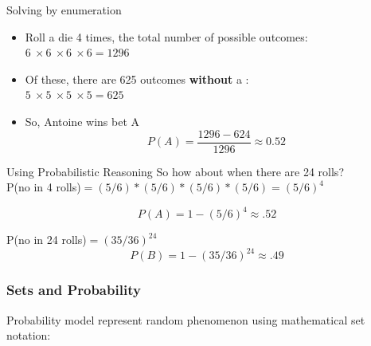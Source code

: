\documentclass{beamer}
\def\die#1{{\domino#1}}
\numberwithin{equation}{section}
\begin{document}
\begin{frame}{Solving by enumeration}
\begin{itemize}
\item[] Roll a die 4 times, the total number of possible outcomes:\\ $6\ \times 6\ \times 6\ \times 6 = 1296$\pause
\item[] Of these, there are 625 outcomes \textbf{without} a \die1:\\  $5\ \times 5\ \times 5\ \times 5 = 625$\pause
\item[] So, Antoine wins bet A 
$$P(A)= \frac{1296-624}{1296} \approx 0.52$$
\end{itemize}
\end{frame}


\begin{frame}{Using Probabilistic Reasoning}
So how about when there are 24 rolls?\\
\vspace{1 cm}
\pause
\vspace{1 cm}
P(no \die1 in 4 rolls)$ = (5/6)*(5/6)*(5/6)*(5/6)=(5/6)^4$

$$P(A) = 1- (5/6)^4\approx .52$$
\pause

\vspace{1 cm}

P(no \die1\die1 in 24 rolls)$ = (35/36)^{24}$
$$P(B)=1-(35/36)^{24} \approx .49$$
\end{frame}


\begin{frame}
\frametitle{Sets and Probability}

Probability model represent random phenomenon using mathematical set notation:\pause 
\begin{itemize}
 \pause 
{} \pause 
{} 
\end{itemize}
\end{frame}
\end{document}
